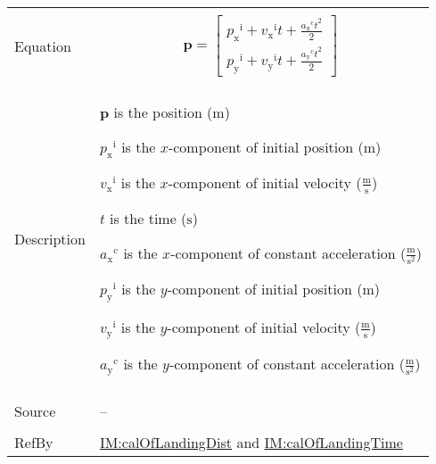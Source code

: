 \documentclass[12pt]{article}
\begin{document}
\begin{minipage}{\textwidth}
\begin{tabular}{>{\raggedright}p{}>{\raggedright\arraybackslash}p{}}
\\ \midrule \\
Equation & \begin{displaymath}
           \mathbf{p}=\begin{bmatrix}
                      {{p_{\text{x}}}^{\text{i}}}+{{v_{\text{x}}}^{\text{i}}} t+\frac{{{a_{\text{x}}}^{\text{c}}} t^{2}}{2}\\
                      {{p_{\text{y}}}^{\text{i}}}+{{v_{\text{y}}}^{\text{i}}} t+\frac{{{a_{\text{y}}}^{\text{c}}} t^{2}}{2}
                      \end{bmatrix}
           \end{displaymath}
\\ \midrule \\
Description & \begin{symbDescription}
              \item{$\mathbf{p}$ is the position (${\text{m}}$)}
              \item{${{p_{\text{x}}}^{\text{i}}}$ is the $x$-component of initial position (${\text{m}}$)}
              \item{${{v_{\text{x}}}^{\text{i}}}$ is the $x$-component of initial velocity ($\frac{\text{m}}{\text{s}}$)}
              \item{$t$ is the time (${\text{s}}$)}
              \item{${{a_{\text{x}}}^{\text{c}}}$ is the $x$-component of constant acceleration ($\frac{\text{m}}{\text{s}^{2}}$)}
              \item{${{p_{\text{y}}}^{\text{i}}}$ is the $y$-component of initial position (${\text{m}}$)}
              \item{${{v_{\text{y}}}^{\text{i}}}$ is the $y$-component of initial velocity ($\frac{\text{m}}{\text{s}}$)}
              \item{${{a_{\text{y}}}^{\text{c}}}$ is the $y$-component of constant acceleration ($\frac{\text{m}}{\text{s}^{2}}$)}
              \end{symbDescription}
\\ \midrule \\
Source & --
         
\\ \midrule \\
RefBy & \hyperref[IM:calOfLandingDist]{IM:calOfLandingDist} and \hyperref[IM:calOfLandingTime]{IM:calOfLandingTime}
        
\\ \bottomrule
\end{tabular}
\end{minipage}
\end{document}

